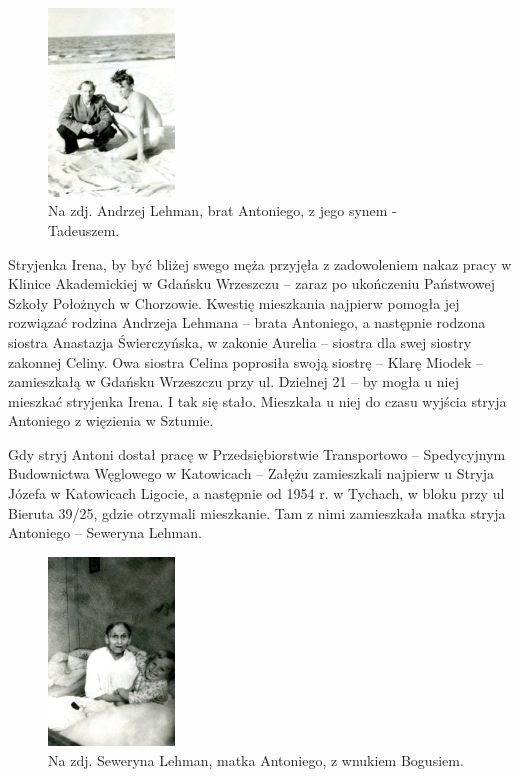 \begin{figure}[!h]
\begin{center}
\includegraphics[width=0.3\textwidth]{photo/andrzej_lehman.jpg}
\caption[Andrzej Lehman]{Na zdj. Andrzej Lehman, brat Antoniego, z jego synem - Tadeuszem.}
\label{rys:andrzej_lehman}
\end{center}
\end{figure}

Stryjenka Irena, by być bliżej swego męża przyjęła z zadowoleniem nakaz pracy w Klinice Akademickiej w Gdańsku Wrzeszczu -- zaraz po ukończeniu Państwowej Szkoły Położnych w Chorzowie. Kwestię mieszkania najpierw pomogła jej rozwiązać rodzina Andrzeja Lehmana -- brata Antoniego, a następnie rodzona siostra Anastazja Świerczyńska, w zakonie Aurelia – siostra dla swej siostry zakonnej Celiny. Owa siostra Celina poprosiła swoją siostrę -- Klarę Miodek -- zamieszkałą w Gdańsku Wrzeszczu przy ul. Dzielnej 21 -- by mogła u niej mieszkać stryjenka Irena. I tak się stało. Mieszkała u niej do czasu wyjścia stryja Antoniego z więzienia w Sztumie.

Gdy stryj Antoni dostał pracę w Przedsiębiorstwie Transportowo -- Spedycyjnym Budownictwa Węglowego w Katowicach -- Załężu zamieszkali najpierw u Stryja Józefa w Katowicach Ligocie, a następnie od 1954 r. w Tychach, w bloku przy ul Bieruta 39/25, gdzie otrzymali mieszkanie. Tam z nimi zamieszkała matka stryja Antoniego -- Seweryna Lehman.

\begin{figure}[!h]
\begin{center}
\includegraphics[width=0.3\textwidth]{photo/seweryna_lehman.jpg}
\caption[Seweryna Lehman z wnukiem Bogusiem]{Na zdj. Seweryna Lehman, matka Antoniego, z wnukiem Bogusiem.}
\label{rys:seweryna_lehman}
\end{center}
\end{figure}

